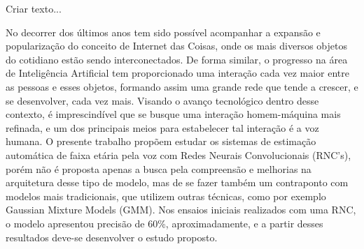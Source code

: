 \fichacatalografica

\folhadeaprovacao


\begin{agradecimentos}
Criar texto...
\end{agradecimentos}

\begin{epigrafe}
\end{epigrafe}

\begin{resumo}
  No decorrer dos últimos anos tem sido possível acompanhar a expansão e popularização do conceito de Internet das Coisas, onde os mais diversos objetos do cotidiano estão sendo interconectados. De forma similar, o progresso na área de Inteligência Artificial tem proporcionado uma interação cada vez maior entre as pessoas e esses objetos, formando assim uma grande rede que tende a crescer, e se desenvolver, cada vez mais. Visando o avanço tecnológico dentro desse contexto, é imprescindível que se busque uma interação homem-máquina mais refinada, e um dos principais meios para estabelecer tal interação é a voz humana. O presente trabalho propõem estudar os sistemas de estimação automática de faixa etária pela voz com Redes Neurais Convolucionais (RNC's), porém não é proposta apenas a busca pela compreensão e melhorias na arquitetura desse tipo de modelo, mas de se fazer também um contraponto com modelos mais tradicionais, que utilizem outras técnicas, como por exemplo Gaussian Mixture Models (GMM). Nos ensaios iniciais realizados com uma RNC, o modelo apresentou precisão de 60\%, aproximadamente, e a partir desses resultados deve-se desenvolver o estudo proposto.
\end{resumo}

\begin{abstract}
  \keywords{}
\end{abstract}

\listoftodos
\listoffigures
\listoftables
\listofalgorithms
\printglossaries
\tableofcontents

